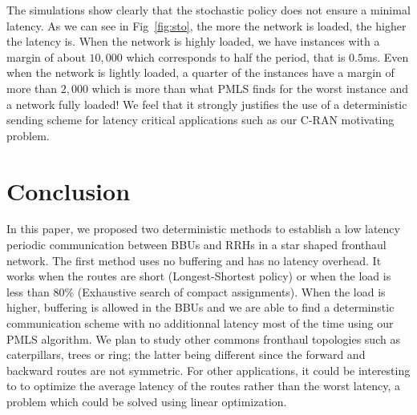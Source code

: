 \documentclass[10pt, conference, letterpaper]{IEEEtran}
\begin{document}
     The simulations show clearly that the stochastic policy does not ensure a minimal latency. As we can see in Fig~\ref{fig:sto}, the more the network is loaded, the higher the latency is. When the network is highly loaded, we have instances with a margin of about $10,000$ which corresponds to half the period, that is $0.5$ms. Even when the network is lightly loaded, a quarter of the instances have a margin of more than $2,000$ which is more than what PMLS finds for the worst instance and a network fully loaded! We feel that it strongly justifies the use of a deterministic sending scheme for latency critical applications such as our C-RAN motivating problem.
     
     
 \section{Conclusion}
In this paper, we proposed two deterministic methods to establish a low latency periodic communication between BBUs and RRHs in 
a star shaped fronthaul network. The first method uses no buffering and has no latency overhead. It works when the routes are short (Longest-Shortest policy) or when the load is less than $80\%$ (Exhaustive search of compact assignments).  
When the load is higher, buffering is allowed in the BBUs and we are able to find a determinstic communication scheme 
with no additionnal latency most of the time using our PMLS algorithm. 
We plan to study other commons fronthaul topologies such as caterpillars, trees or ring; the latter being different since 
the forward and backward routes are not symmetric. For other applications, it could be interesting to to optimize the average latency of the routes rather than the worst latency, a problem which could be solved using linear optimization.  

%    
% 

%   



\end{document}
